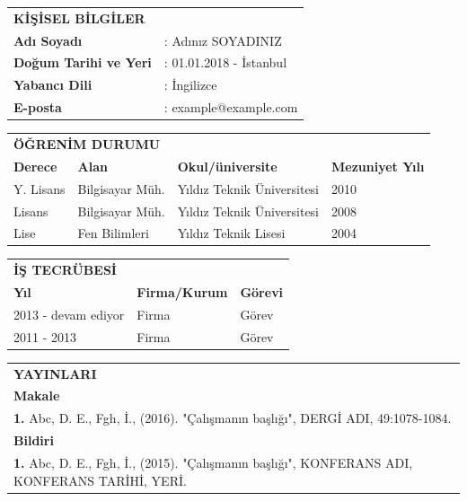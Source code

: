 \documentclass[a4paper,12pt]{report}
\begin{document}
\begin{table}[!h]
\begin{tabular}{l l}
\multicolumn{2}{l}{\bfseries{KİŞİSEL BİLGİLER}}\\[2ex]
\bfseries{Adı Soyadı} & : Adınız SOYADINIZ\\[2ex]
\bfseries{Doğum Tarihi ve Yeri} & : 01.01.2018 - İstanbul\\[2ex]
\bfseries{Yabancı Dili} & : İngilizce\\[2ex]
\bfseries{E-posta} & : example@example.com\\[5ex]
\end{tabular}

\begin{tabular}{l l l p{3cm}}
\multicolumn{4}{l}{\bfseries{ÖĞRENİM DURUMU}}\\[2ex]
\bfseries{Derece} & \bfseries{Alan} & \bfseries{Okul/üniversite} & \bfseries{Mezuniyet Yılı} \\[2ex]
Y. Lisans & Bilgisayar Müh. & Yıldız Teknik Üniversitesi & 2010 \\ [2ex]
Lisans & Bilgisayar Müh. & Yıldız Teknik Üniversitesi & 2008 \\[2ex]
Lise & Fen Bilimleri & Yıldız Teknik Lisesi & 2004 \\[2ex]
\end{tabular}

\begin{tabular}{p{4.5cm} p{5.4cm} l}
\multicolumn{3}{l}{\bfseries{İŞ TECRÜBESİ}}\\[2ex]
\bfseries{Yıl} & \bfseries{Firma/Kurum} & \bfseries{Görevi} \\[2ex]
2013 - devam ediyor & Firma & Görev \\[2ex]
2011 - 2013 & Firma & Görev \\[2ex]
\end{tabular}
\end{table}

\begin{table}[!ht]
\begin{tabular}{p{15.5cm}}
\bfseries{YAYINLARI} \\[2ex]
\bfseries{Makale} \\[2ex]
\textbf{1.} Abc, D. E., Fgh, İ., (2016). "Çalışmanın başlığı", DERGİ ADI, 49:1078-1084. \\[5ex]
\bfseries{Bildiri} \\[2ex]
\textbf{1.} Abc, D. E., Fgh, İ., (2015). "Çalışmanın başlığı", KONFERANS ADI, KONFERANS TARİHİ, YERİ. \\[2ex]
\end{tabular}

\end{table}


\end{document}
